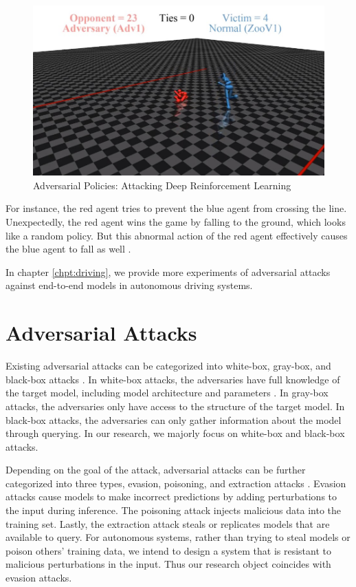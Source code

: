 \begin{figure}[H]
\centering
\includegraphics[scale=0.4]{figures/chapter_intro/adv_policy.jpg}
\caption{Adversarial Policies: Attacking Deep Reinforcement Learning}
\label{fig.adv_policy}
\end{figure}

For instance, the red agent tries to prevent the blue agent from crossing the line. Unexpectedly, the red agent wins the game by falling to the ground, which looks like a random policy. But this abnormal action of the red agent effectively causes the blue agent to fall as well \cite{gleave2021adversarial}. 

In chapter \ref{chpt:driving}, we provide more experiments of adversarial attacks against end-to-end models in autonomous driving systems.

\section{Adversarial Attacks}
\label{sec:adv_attack}

Existing adversarial attacks can be categorized into white-box, gray-box, and black-box attacks \cite{REN2020346}. In white-box attacks, the adversaries have full knowledge of the target model, including model architecture and parameters \cite{goodfellow2015explaining}. In gray-box attacks, the adversaries only have access to the structure of the target model. In black-box attacks, the adversaries can only gather information about the model through querying. In our research, we majorly focus on white-box and black-box attacks.

Depending on the goal of the attack, adversarial attacks can be further categorized into three types, evasion, poisoning, and extraction attacks \cite{art2018}. Evasion attacks cause models to make incorrect predictions by adding perturbations to the input during inference. The poisoning attack injects malicious data into the training set. Lastly, the extraction attack steals or replicates models that are available to query. For autonomous systems, rather than trying to steal models or poison others' training data, we intend to design a system that is resistant to malicious perturbations in the input. Thus our research object coincides with evasion attacks.

